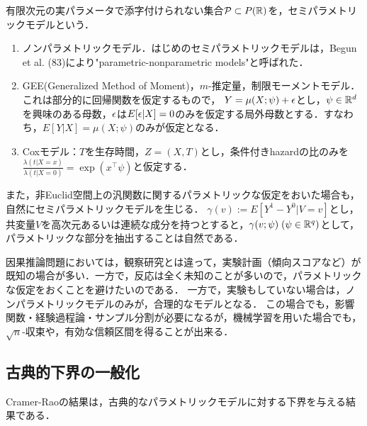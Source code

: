 \documentclass[uplatex,dvipdfmx]{jsreport}
\begin{document}
\begin{definition}
    有限次元の実パラメータで添字付けられない集合$\mathcal{P}\subset P(\mathbb{R})$を，セミパラメトリックモデルという．
\end{definition}

\begin{example}\mbox{}
    \begin{enumerate}
        \item ノンパラメトリックモデル．はじめのセミパラメトリックモデルは，Begun et al. (83)により"parametric-nonparametric models"と呼ばれた．
        \item GEE(Generalized Method of Moment)，$m$-推定量，制限モーメントモデル．これは部分的に回帰関数を仮定するもので，
        $Y=\mu(X;\psi)+\epsilon$とし，$\psi\in\mathbb{R}^d$を興味のある母数，$\epsilon$は$E[\epsilon|X]=0$のみを仮定する局外母数とする．すなわち，$E[Y|X]=\mu(X;\psi)$のみが仮定となる．
        \item Coxモデル：$T$を生存時間，$Z=(X,T)$とし，条件付きhazardの比のみを$\frac{\lambda(t|X=x)}{\lambda(t|X=0)}=\exp(x^\top\psi)$と仮定する．
    \end{enumerate}
    また，非Euclid空間上の汎関数に関するパラメトリックな仮定をおいた場合も，自然にセミパラメトリックモデルを生じる．
    $\gamma(v):=E[Y^1-Y^0|V=v]$とし，共変量$V$を高次元あるいは連続な成分を持つとすると，$\gamma(v;\psi)\;(\psi\in\mathbb{R}^q)$として，パラメトリックな部分を抽出することは自然である．
\end{example}

\begin{remark}
    因果推論問題においては，観察研究とは違って，実験計画（傾向スコアなど）が既知の場合が多い．一方で，反応は全く未知のことが多いので，パラメトリックな仮定をおくことを避けたいのである．
    一方で，実験もしていない場合は，ノンパラメトリックモデルのみが，合理的なモデルとなる．
    この場合でも，影響関数・経験過程論・サンプル分割が必要になるが，機械学習を用いた場合でも，$\sqrt{n}$-収束や，有効な信頼区間を得ることが出来る．
\end{remark}

\subsection{古典的下界の一般化}

\begin{tcolorbox}[colframe=ForestGreen, colback=ForestGreen!10!white,breakable,colbacktitle=ForestGreen!40!white,coltitle=black,fonttitle=\bfseries\sffamily,
title=]
    Cramer-Raoの結果は，古典的なパラメトリックモデルに対する下界を与える結果である．
\end{tcolorbox}
\end{document}
